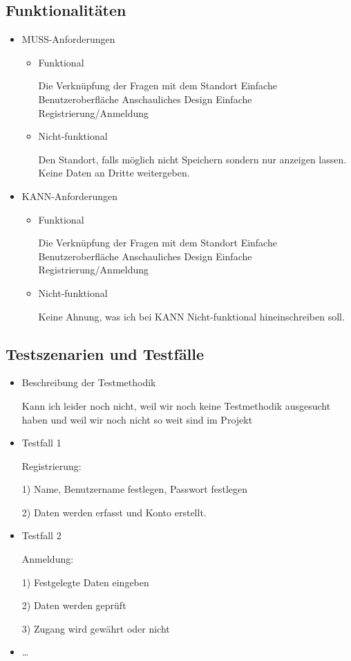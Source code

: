 \subsection{Funktionalitäten}
\begin{itemize}
	\item MUSS-Anforderungen
	\begin{itemize}
		\item Funktional
		
		Die Verknüpfung der Fragen mit dem Standort
		Einfache Benutzeroberfläche
		Anschauliches Design
		Einfache Registrierung/Anmeldung
		
		\item Nicht-funktional
		
		Den Standort, falls möglich nicht Speichern sondern nur anzeigen lassen.
		Keine Daten an Dritte weitergeben.
		
	\end{itemize}
	\item KANN-Anforderungen
	\begin{itemize}
		\item Funktional
		
		Die Verknüpfung der Fragen mit dem Standort
		Einfache Benutzeroberfläche
		Anschauliches Design
		Einfache Registrierung/Anmeldung
		
		
		\item Nicht-funktional
		
		Keine Ahnung, was ich bei KANN Nicht-funktional hineinschreiben soll.
		
	\end{itemize}
\end{itemize}
\subsection{Testszenarien und Testfälle}
\begin{itemize}
	\item Beschreibung der Testmethodik
	
	Kann ich leider noch nicht, weil wir noch keine Testmethodik ausgesucht haben und weil wir noch nicht so weit sind im Projekt
	
	\item Testfall 1
	
	Registrierung:
	
	1) Name, Benutzername festlegen, Passwort festlegen
	
	2) Daten werden erfasst und Konto erstellt.
	
	\item Testfall 2
	
	Anmeldung:
	
	1) Festgelegte Daten eingeben
	
	2) Daten werden geprüft
	
	3) Zugang wird gewährt oder nicht
	
	\item \ldots
\end{itemize}
